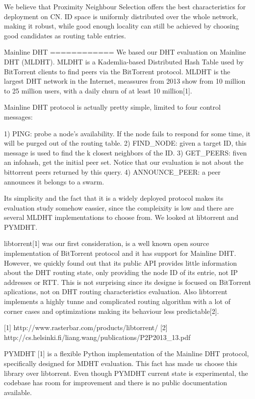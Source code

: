 We believe that Proximity Neighbour Selection offers the best characteristics for 
deployment on CN. ID space is uniformly distributed over the whole network, making 
it robust, while good enough locality can still be achieved by choosing good candidates 
as routing table entries.


Mainline DHT
============
We based our DHT evaluation on Mainline DHT (MLDHT). MLDHT is a Kademlia-based 
Distributed Hash Table used by BitTorrent clients to find peers via the BitTorrent 
protocol. MLDHT is the largest DHT network in the Internet, meassures from 2013 
show from 10 million to 25 million users, with a daily churn of at least 10 million[1].

Mainline DHT protocol is actually pretty simple, limited to four control messages:

1) PING: probe a node's availability. If the node fails to respond for some time, 
    it will be purged out of the routing table.
2) FIND_NODE: given a target ID, this message is used to find the {k} closest neighbors of the ID.
3) GET_PEERS: fiven an infohash, get the initial peer set. Notice that our evaluation 
    is not about the bittorrent peers returned by this query.
4) ANNOUNCE_PEER: a peer announces it belongs to a swarm.


Its simplicity and the fact that it is a widely deployed protocol makes its evaluation 
study somehow eassier, since the compleixity is low and there are several MLDHT 
implementations to choose from. We looked at libtorrent and PYMDHT.

libtorrent[1] was our first consideration, is a well known open source implementation 
of BitTorrent protocol and it has support for Mainline DHT. However, we quickly found out 
that its public API provides little information about the DHT routing state, only 
providing the node ID of its entrie, not IP addresses or RTT. This is not surprising since its designe is 
focused on BitTorrent aplications, not on DHT routing characteristics evaluation. 
Also libtorrent implements a highly tunne and complicated routing algorithm with a 
lot of corner cases and optimizations making its behaviour less predictable[2].

    [1] http://www.rasterbar.com/products/libtorrent/
    [2] http://cs.helsinki.fi/liang.wang/publications/P2P2013_13.pdf

PYMDHT [1] is a flexible Python implementation of the Mainline DHT protocol, 
specifically designed for MDHT evaluation. This fact has made us choose this 
library over libtorrent. Even though PYMDHT current state is experimental, 
the codebase has room for improvement and there is no public documentation available.

